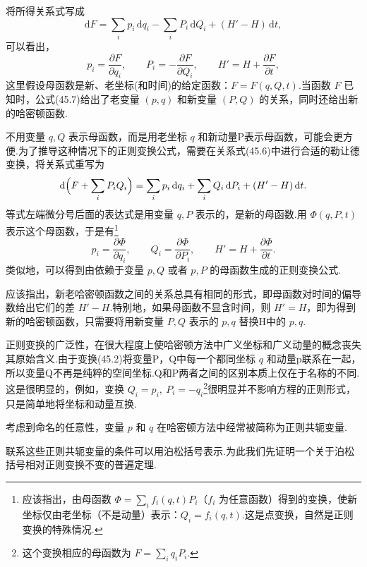 将所得关系式写成
\begin{equation}
  \mathrm{d}F=\sum_i p_i\,\mathrm{d}q_i-\sum_i P_i\,\mathrm{d}Q_i
  +(H'-H)\,\mathrm{d}t,
\end{equation}
可以看出，
\begin{equation}
  p_i=\frac{\partial F}{\partial q_i},\qquad
  P_i=-\frac{\partial F}{\partial Q_i},\qquad
  H'=H+\frac{\partial F}{\partial t},
\end{equation}
这里假设母函数是新、老坐标(和时间)的给定函数：$F=F(q,Q,t)$.当函数
$F$ 已知时，公式(45.7)给出了老变量 $(p,q)$ 和新变量 $(P,Q)$
的关系，同时还给出新的哈密顿函数.

不用变量 $q,Q$
表示母函数，而是用老坐标 $q$
和新动量P表示母函数，可能会更方便.为了推导这种情况下的正则变换公式，需要在关系式(45.6)中进行合适的勒让德变换，将关系式重写为
\begin{equation*}
  \mathrm{d}\Bigl(F+\sum_i P_iQ_i\Bigr)
  =\sum_i p_i\,\mathrm{d}q_i+\sum_i Q_i\,\mathrm{d}P_i
  +(H'-H)\,\mathrm{d}t.
\end{equation*}
等式左端微分号后面的表达式是用变量 $q,P$
表示的，是新的母函数.用 $\Phi(q,P,t)$ 表示这个母函数，于是有\footnote{应该指出，由母函数 $\Phi=\sum_i f_i(q,t)P_i$（$f_i$ 为任意函数）得到的变换，使新坐标仅由老坐标（不是动量）表示：$Q_i=f_i(q,t)$.这是点变换，自然是正则变换的特殊情况.}
\begin{equation}
  p_i=\frac{\partial\Phi}{\partial q_i},\qquad
  Q_i=\frac{\partial\Phi}{\partial P_i},\qquad
  H'=H+\frac{\partial\Phi}{\partial t}.
\end{equation}
类似地，可以得到由依赖于变量 $p,Q$ 或者 $p,P$
的母函数生成的正则变换公式.

应该指出，新老哈密顿函数之间的关系总具有相同的形式，即母函数对时间的偏导数给出它们的差
$H'-H$.特别地，如果母函数不显含时间，则 $H'=H$，即为得到新的哈密顿函数，只需要将用新变量
$P,Q$ 表示的 $p,q$ 替换H中的 $p,q$.

正则变换的广泛性，在很大程度上使哈密顿方法中广义坐标和广义动量的概念丧失其原始含义.由于变换(45.2)将变量P，Q中每一个都同坐标
$q$ 和动量p联系在一起，所以变量Q不再是纯粹的空间坐标.Q和P两者之间的区别本质上仅在于名称的不同.这是很明显的，例如，变换
$Q_i=p_i,\ P_i=-q_i$\footnote{这个变换相应的母函数为 $F=\sum_i q_iP_i$.}很明显并不影响方程的正则形式，只是简单地将坐标和动量互换.

考虑到命名的任意性，变量 $p$ 和
$q$ 在哈密顿方法中经常被简称为正则共轭变量.

联系这些正则共轭变量的条件可以用泊松括号表示.为此我们先证明一个关于泊松括号相对正则变换不变的普遍定理.

